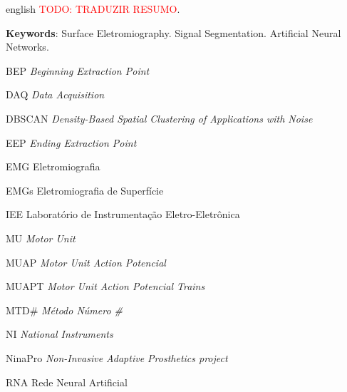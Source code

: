 \begin{resumo}[Abstract]
 \begin{otherlanguage*}{english}
	\textcolor{red}{TODO: TRADUZIR RESUMO}.
	
   \vspace{\onelineskip}
   \noindent 
   \textbf{Keywords}: Surface Eletromiography. Signal Segmentation. Artificial Neural Networks.
 \end{otherlanguage*}
\end{resumo}


\listoffigures*
\cleardoublepage

\listoftables*
\cleardoublepage

\begin{siglas}
	\item[BEP]		\emph{Beginning Extraction Point}
	\item[DAQ]		\emph{Data Acquisition}
	\item[DBSCAN]	\emph{Density-Based Spatial Clustering of Applications with Noise}
	\item[EEP]		\emph{Ending Extraction Point}
  	\item[EMG]		Eletromiografia
	\item[EMGs]		Eletromiografia de Superfície
	\item[IEE]		Laboratório de Instrumentação Eletro-Eletrônica
	\item[MU]		\emph{Motor Unit}
  	\item[MUAP]		\emph{Motor Unit Action Potencial}
	\item[MUAPT]	\emph{Motor Unit Action Potencial Trains}
	\item[MTD\#]	\emph{Método Número \#}
	\item[NI]		\emph{National Instruments}
	\item[NinaPro]	\emph{Non-Invasive Adaptive Prosthetics project}
	\item[RNA]		Rede Neural Artificial
\end{siglas}

\tableofcontents*
\cleardoublepage

\textual
